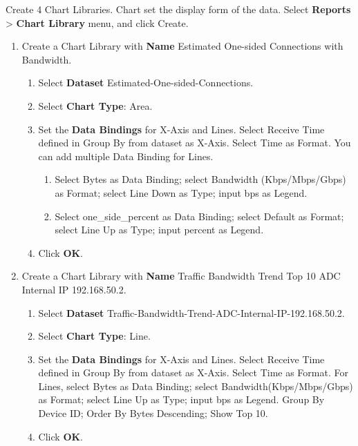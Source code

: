 \begin{description}
\begin{enumerate}
\begin{enumerate}
        \end{enumerate}
    \end{enumerate}
    \item[STEP 2.]	Create 4 Chart Libraries. Chart set the display form of the data. Select \textbf{Reports} > \textbf{Chart Library} menu, and click Create.
    \begin{enumerate} 
        \item 	Create a Chart Library with \textbf{Name} Estimated One-sided Connections with Bandwidth.
        \begin{enumerate}
            \item	Select \textbf{Dataset} Estimated-One-sided-Connections.
            \item	Select \textbf{Chart Type}: Area.
            \item	Set the \textbf{Data Bindings} for X-Axis and Lines. Select Receive Time defined in Group By from dataset as X-Axis. Select Time as Format. You can add multiple Data Binding for Lines.
            \begin{enumerate}
                \item	Select Bytes as Data Binding; select Bandwidth (Kbps/Mbps/Gbps) as Format; select Line Down as Type; input bps as Legend. 
                \item	Select one\_side\_percent as Data Binding; select Default as Format; select Line Up as Type; input percent as Legend.
            \end{enumerate}
            \item	Click \textbf{OK}.
        \end{enumerate}
        \item 	Create a Chart Library with \textbf{Name} Traffic Bandwidth Trend Top 10 ADC Internal IP 192.168.50.2.
        \begin{enumerate}
            \item	Select \textbf{Dataset} Traffic-Bandwidth-Trend-ADC-Internal-IP-192.168.50.2.
            \item	Select \textbf{Chart Type}: Line.
            \item	Set the \textbf{Data Bindings} for X-Axis and Lines. Select Receive Time defined in Group By from dataset as X-Axis. Select Time as Format. For Lines, select Bytes as Data Binding; select Bandwidth(Kbps/Mbps/Gbps) as Format; select Line Up as Type; input bps as Legend. Group By Device ID; Order By Bytes Descending; Show Top 10.
            \item	Click \textbf{OK}.

\end{enumerate}
\end{enumerate}
\end{description}
